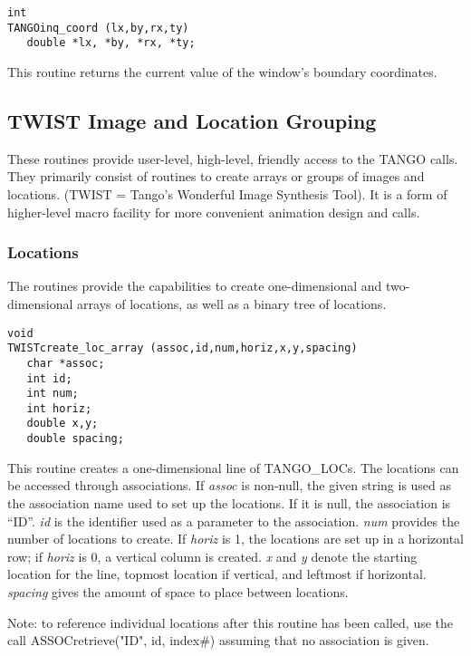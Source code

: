 \vspace{1em}
\begin{verbatim}
int
TANGOinq_coord (lx,by,rx,ty) 
   double *lx, *by, *rx, *ty;
\end{verbatim}
This routine returns the current value of the window's boundary
coordinates. 

\subsection{TWIST Image and Location Grouping}
These routines provide user-level, high-level, friendly access to the
TANGO calls. 
They primarily consist of routines to create arrays or groups of images and
locations.  (TWIST = Tango's Wonderful Image Synthesis Tool).
It is a form of higher-level macro facility for more convenient animation
design and calls.

\subsubsection{Locations}
The routines provide the capabilities to create one-dimensional and
two-dimensional arrays of locations, as well as a binary tree of locations.

\vspace{1em}
\begin{verbatim}
void
TWISTcreate_loc_array (assoc,id,num,horiz,x,y,spacing) 
   char *assoc;
   int id;
   int num;
   int horiz;
   double x,y;
   double spacing; 
\end{verbatim} 
This routine creates a
one-dimensional line of TANGO\_LOCs.  The locations can be accessed
through associations.  If {\em assoc} is non-null, the given string is
used as the association name used to set up the locations.  If it is
null, the association is ``ID''.  {\em id} is the identifier used as a
parameter to the association.  {\em num} provides the number of
locations to create.  If {\em horiz} is 1, the locations are set up in
a horizontal row; if {\em horiz} is 0, a vertical column is created.
{\em x} and {\em y} denote the starting location for the line, topmost
location if vertical, and leftmost if horizontal.  {\em spacing} gives
the amount of space to place between locations.  

Note: to reference individual locations after this routine has been
called, use the call ASSOCretrieve("ID", id, index\#) assuming that no
association is given.

